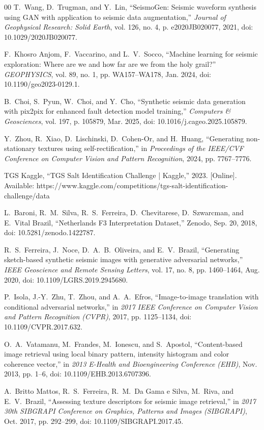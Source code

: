 \documentclass{ieeeaccess}
\begin{document}
\begin{thebibliography}{00}
T.~Wang, D.~Trugman, and Y.~Lin, ``SeismoGen: Seismic waveform synthesis using GAN with application to seismic data augmentation,'' \emph{Journal of Geophysical Research: Solid Earth}, vol. 126, no. 4, p. e2020JB020077, 2021, doi: 10.1029/2020JB020077.

F.~Khosro Anjom, F.~Vaccarino, and L.~V.~Socco, ``Machine learning for seismic exploration: Where are we and how far are we from the holy grail?'' \emph{GEOPHYSICS}, vol. 89, no. 1, pp. WA157--WA178, Jan. 2024, doi: 10.1190/geo2023-0129.1.

B.~Choi, S.~Pyun, W.~Choi, and Y.~Cho, ``Synthetic seismic data generation with pix2pix for enhanced fault detection model training,'' \emph{Computers \& Geosciences}, vol. 197, p. 105879, Mar. 2025, doi: 10.1016/j.cageo.2025.105879.

Y.~Zhou, R.~Xiao, D.~Lischinski, D.~Cohen-Or, and H.~Huang, ``Generating non-stationary textures using self-rectification,'' in \emph{Proceedings of the IEEE/CVF Conference on Computer Vision and Pattern Recognition}, 2024, pp. 7767--7776.

TGS Kaggle, ``TGS Salt Identification Challenge | Kaggle,'' 2023. [Online]. Available: https://www.kaggle.com/competitions/tgs-salt-identification-challenge/data

L.~Baroni, R.~M.~Silva, R.~S.~Ferreira, D.~Chevitarese, D.~Szwarcman, and E.~Vital Brazil, ``Netherlands F3 Interpretation Dataset,'' Zenodo, Sep. 20, 2018, doi: 10.5281/zenodo.1422787.

R.~S.~Ferreira, J.~Noce, D.~A.~B.~Oliveira, and E.~V.~Brazil, ``Generating sketch-based synthetic seismic images with generative adversarial networks,'' \emph{IEEE Geoscience and Remote Sensing Letters}, vol. 17, no. 8, pp. 1460--1464, Aug. 2020, doi: 10.1109/LGRS.2019.2945680.

P.~Isola, J.-Y.~Zhu, T.~Zhou, and A.~A.~Efros, ``Image-to-image translation with conditional adversarial networks,'' in \emph{2017 IEEE Conference on Computer Vision and Pattern Recognition (CVPR)}, 2017, pp. 1125--1134, doi: 10.1109/CVPR.2017.632.

O.~A.~Vatamanu, M.~Frandes, M.~Ionescu, and S.~Apostol, ``Content-based image retrieval using local binary pattern, intensity histogram and color coherence vector,'' in \emph{2013 E-Health and Bioengineering Conference (EHB)}, Nov. 2013, pp. 1--6, doi: 10.1109/EHB.2013.6707396.

A.~Britto Mattos, R.~S.~Ferreira, R.~M.~Da Gama e Silva, M.~Riva, and E.~V.~Brazil, ``Assessing texture descriptors for seismic image retrieval,'' in \emph{2017 30th SIBGRAPI Conference on Graphics, Patterns and Images (SIBGRAPI)}, Oct. 2017, pp. 292--299, doi: 10.1109/SIBGRAPI.2017.45.

\end{thebibliography}
\end{document}
